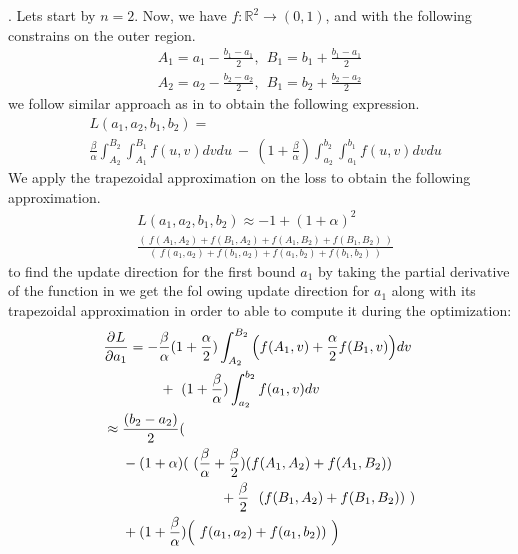 .
Lets start by $n=2$. Now, we have $f: \mathbb{R}^{2} \rightarrow (0,1)$, and with the following constrains on the outer region.
\begin{equation}
\begin{aligned} 
 A_1 =  a_{1}-\frac{b_{1}-a_{1}}{2} ,~~  B_1 =  b_{1}+\frac{b_{1}-a_{1}}{2} \\
  A_2 =  a_{2}-\frac{b_{2}-a_{2}}{2} ,~~  B_1 =  b_{2}+\frac{b_{2}-a_{2}}{2}
\label{eq:fixed-assumption-2-w}
\end{aligned}
\end{equation}
we follow similar approach as in \eqLabel{\ref{eq:loss-oir2-sup}} to obtain the following expression.
\begin{equation}
\begin{aligned} 
&L(a_{1},a_{2},b_{1},b_{2}) =\\ &  \frac{\beta}{\alpha} \int_{A_2}^{B_2}\int_{A_1}^{B_1}f(u,v)dvdu ~- ~(1+\frac{\beta}{\alpha}) \int_{a_{2}}^{b_{2}}\int_{a_{1}}^{b_{1}}f(u,v)dvdu 
\label{eq:outer-integration2-w}
\end{aligned}
\end{equation}
We apply the trapezoidal approximation on the loss to obtain the following approximation. 
\begin{equation}
\begin{aligned} 
&L(a_{1},a_{2},b_{1},b_{2}) \approx -1 + (1+ \alpha )^2  \\ 
& \frac{(~f(A_{1},A_{2})+f(B_{1},A_{2})+f(A_{1},B_{2})+f(B_{1},B_{2})~)}{(~f(a_{1},a_{2})+f(b_{1},a_{2})+f(a_{1},b_{2})+f(b_{1},b_{2})~)}
\label{eq:outer-integration3-w}
\end{aligned}
\end{equation}
to find the update direction for the first bound $a_1$ by taking the partial derivative of the function in \eqLabel{\ref{eq:outer-integration2}} we get the fol owing update direction for $a_1$ along with its trapezoidal approximation in order to able to compute it during the optimization:
\begin{equation}
\begin{aligned} 
&\frac{\partial^{} L}{\partial a_{1}} = -\frac{\beta}{\alpha}(1+\frac \alpha2)\int_{A_2}^{B_2}\Big(f(A_1,v) + \frac \alpha2 f(B_1,v) \Big)dv  \\ & ~~~~~~~~~~~~+~(1+\frac{\beta}{\alpha})  \int_{a_{2}}^{b_{2}}f(a_1,v)dv  \\  
&\approx \frac{(b_{2}-a_{2})}{2}( \\
&~~~~-(1+ \alpha )(~(\frac{\beta}{\alpha}+ \frac \beta2 )(f(A_{1},A_{2}) + f(A_{1},B_{2}))\\ &~~~~~~~~~~~~~~~~~~~~~~~~~ +\frac \beta2 ~~(f(B_{1},A_{2}) + f(B_{1},B_{2}))~)\\
&~~~~+ (1+\frac{\beta}{\alpha})\Big(~f(a_{1},a_{2}) + f(a_{1},b_{2}))~\Big)
\label{eq:update-outer-2-w}
\end{aligned}
\end{equation}
